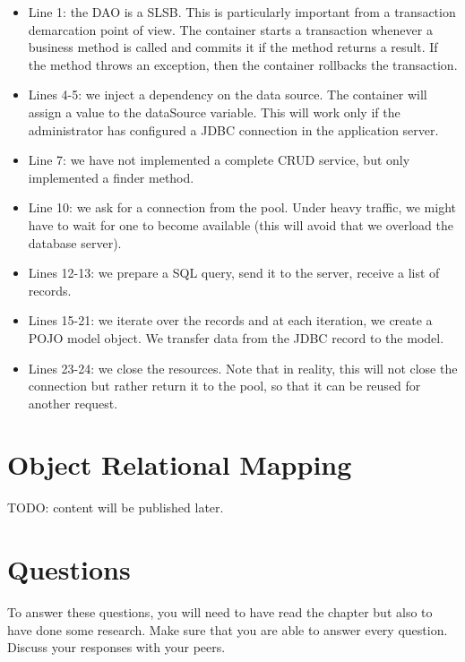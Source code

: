 \begin{itemize}
\item Line 1: the DAO is a \ac{SLSB}. This is particularly important from a transaction demarcation point of view. The container starts a transaction whenever a business method is called and commits it if the method returns a result. If the method throws an exception, then the container rollbacks the transaction.
\item Lines 4-5: we inject a dependency on the data source. The container will assign a value to the dataSource variable. This will work only if the administrator has configured a \ac{JDBC} connection in the application server.
\item Line 7: we have not implemented a complete \ac{CRUD} service, but only implemented a finder method.
\item Line 10: we ask for a connection from the pool. Under heavy traffic, we might have to wait for one to become available (this will avoid that we overload the database server).
\item Lines 12-13: we prepare a SQL query, send it to the server, receive a list of records.
\item Lines 15-21: we iterate over the records and at each iteration, we create a \ac{POJO} model object. We transfer data from the \ac{JDBC} record to the model.
\item Lines 23-24: we close the resources. Note that in reality, this will not close the connection but rather return it to the pool, so that it can be reused for another request.
\end{itemize}

\section{Object Relational Mapping}

TODO: content will be published later.


\section{Questions}

To answer these questions, you will need to have read the chapter but also to have done some research. Make sure that you are able to answer every question. Discuss your responses with your peers.


